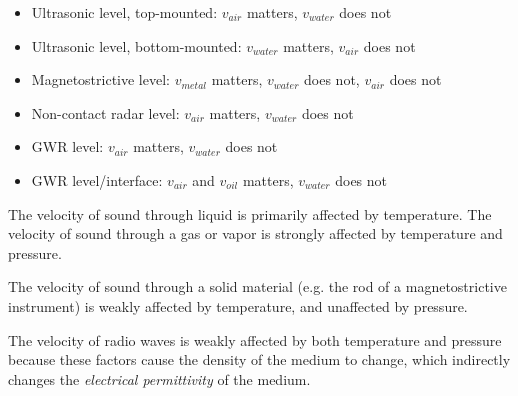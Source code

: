 \begin{itemize}
\item{} Ultrasonic level, top-mounted: $v_{air}$ matters, $v_{water}$ does not
\item{} Ultrasonic level, bottom-mounted: $v_{water}$ matters, $v_{air}$ does not
\item{} Magnetostrictive level: $v_{metal}$ matters, $v_{water}$ does not, $v_{air}$ does not
\item{} Non-contact radar level: $v_{air}$ matters, $v_{water}$ does not
\item{} GWR level: $v_{air}$ matters, $v_{water}$ does not
\item{} GWR level/interface: $v_{air}$ and $v_{oil}$ matters, $v_{water}$ does not
\end{itemize}

The velocity of sound through liquid is primarily affected by temperature.  The velocity of sound through a gas or vapor is strongly affected by temperature and pressure.

\vskip 10pt

The velocity of sound through a solid material (e.g. the rod of a magnetostrictive instrument) is weakly affected by temperature, and unaffected by pressure.

\vskip 10pt

The velocity of radio waves is weakly affected by both temperature and pressure because these factors cause the density of the medium to change, which indirectly changes the {\it electrical permittivity} of the medium.


 



